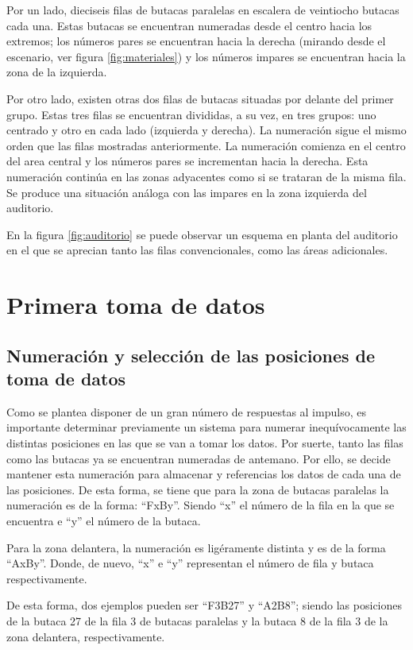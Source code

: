 \documentclass[11pt,a4paper,twoside]{book}
\begin{document}
 			Por un lado, dieciseis filas de butacas paralelas en escalera de veintiocho butacas cada una. Estas butacas se encuentran numeradas desde el centro hacia los extremos; los números pares se encuentran hacia la derecha (mirando desde el escenario, ver figura \ref{fig:materiales}) y los números impares se encuentran hacia la zona de la izquierda.
 
 			Por otro lado, existen otras dos filas de butacas situadas por delante del primer grupo. Estas tres filas se encuentran divididas, a su vez, en tres grupos: uno centrado y otro en cada lado (izquierda y derecha). La numeración sigue el mismo orden que las filas mostradas anteriormente. La numeración comienza en el centro del area central y los números pares se incrementan hacia la derecha. Esta numeración continúa en las zonas adyacentes como si se trataran de la misma fila. Se produce una situación análoga con las impares en la zona izquierda del auditorio.
 
 			En la figura \ref{fig:auditorio} se puede observar un esquema en planta del auditorio en el que se aprecian tanto las filas convencionales, como las áreas adicionales.
			
			
    \section{Primera toma de datos}
	    \subsection{Numeración y selección de las posiciones de toma de datos}
		    Como se plantea disponer de un gran número de respuestas al impulso, es importante determinar previamente un sistema para numerar inequívocamente las distintas posiciones en las que se van a tomar los datos. Por suerte, tanto las filas como las butacas ya se encuentran numeradas de antemano. Por ello, se decide mantener esta numeración para almacenar y referencias los datos de cada una de las posiciones. De esta forma, se tiene que para la zona de butacas paralelas la numeración es de la forma: ``FxBy''. Siendo ``x'' el número de la fila en la que se encuentra e ``y'' el número de la butaca.

		    Para la zona delantera, la numeración es ligéramente distinta y es de la forma ``AxBy''. Donde, de nuevo, ``x'' e ``y'' representan el número de fila y butaca respectivamente.

		    De esta forma, dos ejemplos pueden ser ``F3B27'' y ``A2B8''; siendo las posiciones de la butaca 27 de la fila 3 de butacas paralelas y la butaca 8 de la fila 3 de la zona delantera, respectivamente.
\end{document}
